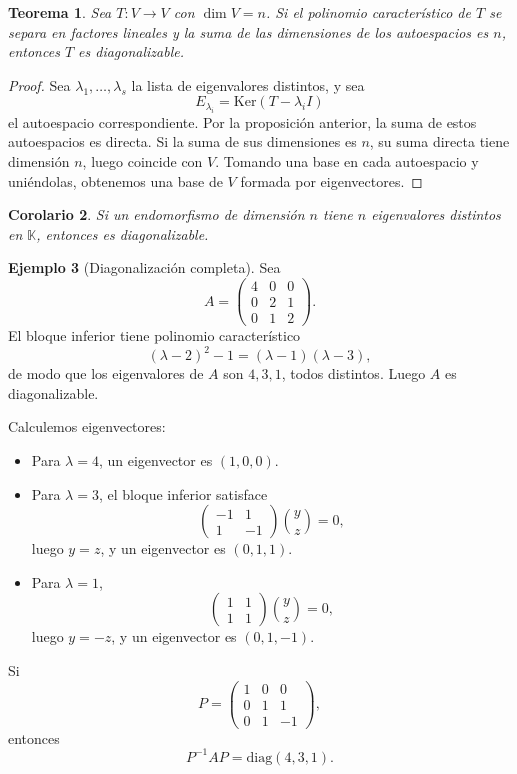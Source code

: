 \documentclass[10pt,a4paper,oneside]{article}
\theoremstyle{plain}
\newtheorem{theorem}{Teorema}[section]
\newtheorem{corollary}[theorem]{Corolario}
\theoremstyle{definition}
\newtheorem{example}[theorem]{Ejemplo}
\theoremstyle{remark}
\newcommand{\K}{\mathbb{K}}
\newcommand{\Ker}{\mathrm{Ker}}
\newcommand{\diag}{\mathrm{diag}}
\begin{document}
\begin{theorem}
Sea \(T:V\to V\) con \(\dim V=n\). Si el polinomio característico de \(T\) se separa en factores lineales y la suma de las dimensiones de los autoespacios es \(n\), entonces \(T\) es diagonalizable.
\end{theorem}

\begin{proof}
Sea \(\lambda_1,\dots,\lambda_s\) la lista de eigenvalores distintos, y sea
\[
E_{\lambda_i}=\Ker(T-\lambda_i I)
\]
el autoespacio correspondiente. Por la proposición anterior, la suma de estos autoespacios es directa. Si la suma de sus dimensiones es \(n\), su suma directa tiene dimensión \(n\), luego coincide con \(V\). Tomando una base en cada autoespacio y uniéndolas, obtenemos una base de \(V\) formada por eigenvectores. \end{proof}

\begin{corollary}
Si un endomorfismo de dimensión \(n\) tiene \(n\) eigenvalores distintos en \(\K\), entonces es diagonalizable.
\end{corollary}

\begin{example}[Diagonalización completa]
Sea
\[
A=
\begin{pmatrix}
4 & 0 & 0\\
0 & 2 & 1\\
0 & 1 & 2
\end{pmatrix}.
\]
El bloque inferior tiene polinomio característico
\[
(\lambda-2)^2-1=(\lambda-1)(\lambda-3),
\]
de modo que los eigenvalores de \(A\) son \(4,3,1\), todos distintos. Luego \(A\) es diagonalizable.

Calculemos eigenvectores:
\begin{itemize}
\item Para \(\lambda=4\), un eigenvector es \((1,0,0)\).
\item Para \(\lambda=3\), el bloque inferior satisface
\[
\begin{pmatrix}
-1 & 1\\
1 & -1
\end{pmatrix}
\binom{y}{z}=0,
\]
luego \(y=z\), y un eigenvector es \((0,1,1)\).
\item Para \(\lambda=1\),
\[
\begin{pmatrix}
1 & 1\\
1 & 1
\end{pmatrix}
\binom{y}{z}=0,
\]
luego \(y=-z\), y un eigenvector es \((0,1,-1)\).
\end{itemize}
Si
\[
P=
\begin{pmatrix}
1 & 0 & 0\\
0 & 1 & 1\\
0 & 1 & -1
\end{pmatrix},
\]
entonces
\[
P^{-1}AP=\diag(4,3,1).
\]
\end{example}
\end{document}
